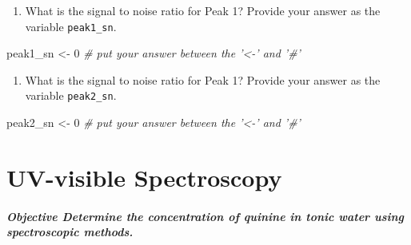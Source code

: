 \documentclass[]{tufte-book}
\newenvironment{Shaded}{}{}
\newcommand{\CommentTok}[1]{\textcolor[rgb]{0.38,0.63,0.69}{\textit{#1}}}
\newcommand{\DecValTok}[1]{\textcolor[rgb]{0.25,0.63,0.44}{#1}}
\newcommand{\NormalTok}[1]{#1}
\newcommand{\StringTok}[1]{\textcolor[rgb]{0.25,0.44,0.63}{#1}}
\providecommand{\tightlist}{%
  \setlength{\itemsep}{0pt}\setlength{\parskip}{0pt}}
\begin{document}
\begin{enumerate}
\def\labelenumi{\arabic{enumi}.}
\setcounter{enumi}{8}
\tightlist
\item
  What is the signal to noise ratio for Peak 1? Provide your answer as the variable \texttt{peak1\_sn}.
\end{enumerate}

\begin{Shaded}
\begin{Highlighting}[]
\NormalTok{peak1_sn <-}\StringTok{ }\DecValTok{0}  \CommentTok{# put your answer between the '<-' and '#'}
\end{Highlighting}
\end{Shaded}

\begin{enumerate}
\def\labelenumi{\arabic{enumi}.}
\setcounter{enumi}{9}
\tightlist
\item
  What is the signal to noise ratio for Peak 1? Provide your answer as the variable \texttt{peak2\_sn}.
\end{enumerate}

\begin{Shaded}
\begin{Highlighting}[]
\NormalTok{peak2_sn <-}\StringTok{ }\DecValTok{0}  \CommentTok{# put your answer between the '<-' and '#'}
\end{Highlighting}
\end{Shaded}

\hypertarget{uv-visible-spectroscopy}{%
\chapter{UV-visible Spectroscopy}\label{uv-visible-spectroscopy}}

\hypertarget{objective-determine-the-concentration-of-quinine-in-tonic-water-using-spectroscopic-methods.}{%
\paragraph{\texorpdfstring{\textbf{Objective} \textbar{} Determine the concentration of quinine in tonic water using spectroscopic methods.}{Objective \textbar{} Determine the concentration of quinine in tonic water using spectroscopic methods.}}\label{objective-determine-the-concentration-of-quinine-in-tonic-water-using-spectroscopic-methods.}}
\end{document}
